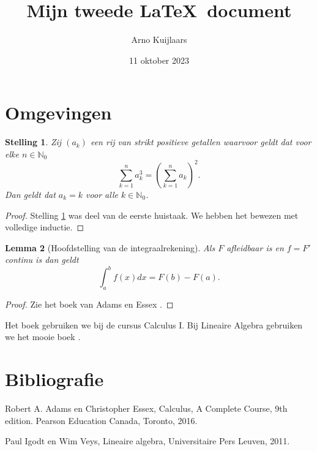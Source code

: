 \documentclass[12pt,a4paper]{article}
\title{Mijn tweede \LaTeX\ document}
\author{Arno Kuijlaars}
\date{11 oktober 2023}
\newtheorem{stelling}{Stelling}
\newtheorem{lemma}[stelling]{Lemma}
\begin{document}
\maketitle
\section{Omgevingen}

\begin{stelling}  \label{huistaak1b}
Zij $(a_k)$ een rij van strikt positieve getallen waarvoor geldt dat 	voor elke $n \in \mathbb N_0$
	\[ \sum_{k=1}^n a_k^3  = \left(\sum_{k=1}^n a_k \right)^2. \]
	Dan geldt dat $a_k = k$ voor alle $k \in \mathbb N_0$.
\end{stelling}

\begin{proof}
Stelling \ref{huistaak1b} was deel van de eerste huistaak.
We hebben het bewezen met volledige inductie.
\end{proof}

\begin{lemma}[Hoofdstelling van de integraalrekening]
Als $F$ afleidbaar is en $f = F'$ continu is dan geldt
\[ \int_a^b f(x) dx = F(b) - F(a). \]
\end{lemma}
\begin{proof} 
Zie het boek van Adams en Essex \cite{Adams-Essex}.
\end{proof}

Het boek \cite{Adams-Essex} gebruiken we bij de cursus Calculus I.
Bij Lineaire Algebra gebruiken we het mooie boek \cite{Igodt-Veys}.

\section{Bibliografie}

\begin{thebibliography}{9}
Robert A. Adams en Christopher Essex, 
Calculus, A Complete Course, 9th edition. 
Pearson Education Canada, Toronto, 2016. 

Paul Igodt en Wim Veys,
Lineaire algebra, Universitaire Pers Leuven, 2011.
\end{thebibliography}
\end{document}
